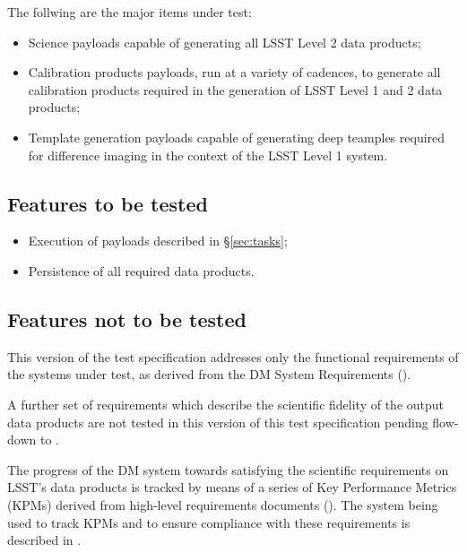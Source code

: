 \documentclass[DM,lsstdraft,STS,toc]{lsstdoc}
\begin{document}
The follwing are the major items under test:

\begin{itemize}

  \item{Science payloads capable of generating all LSST Level 2 data
  products;}

  \item{Calibration products payloads, run at a variety of cadences, to
  generate all calibration products required in the generation of LSST Level 1
  and 2 data products;}

  \item{Template generation payloads capable of generating deep teamples
  required for difference imaging in the context of the LSST Level 1 system.}

\end{itemize}

\subsection{Features to be tested}
\label{sec:feat2test}

\begin{itemize}

  \item{Execution of payloads described in \S\ref{sec:tasks};}
  \item{Persistence of all required data products.}

\end{itemize}


\subsection{Features not to be tested}
\label{sec:featnot2test}

This version of the \product{} test specification addresses only the functional
requirements of the systems under test, as derived from the DM System
Requirements ().

A further set of requirements which describe the scientific fidelity of the
output data products are not tested in this version of this test
specification pending flow-down to .

The progress of the DM system towards satisfying the scientific requirements
on LSST's data products is tracked by means of a series of Key Performance
Metrics (KPMs) derived from high-level requirements documents (). The system being used to track KPMs and to ensure compliance
with these requirements is described in .
\end{document}

